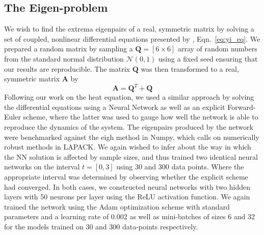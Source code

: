 \documentclass[reprint, english, nofootinbib]{revtex4-2}
\begin{document}
\subsection{The Eigen-problem}
\noindent 
We wish to find the extrema eigenpairs of a real, symmetric matrix by solving a set of coupled, nonlinear differential equations presented by \textcite{Yi_2004}, Eqn.~\ref{eq:yi_eq}. We prepared a random matrix by sampling a $\mathbf Q= [6\times 6]$ array of random numbers from the standard normal distribution $\mathcal N(0, 1)$ using a fixed seed ensuring that our results are reproducible. The matrix $\mathbf Q$ was then transformed to a real, symmetric matrix $\mathbf A$ by
\begin{equation}
    \mathbf A = \mathbf Q^T + \mathbf Q
\end{equation}
Following our work on the heat equation, we used a similar approach by solving the differential equations using a Neural Network as well as an explicit Forward-Euler scheme, where the latter was used to gauge how well the network is able to reproduce the dynamics of the system. The eigenpairs produced by the network were benchmarked against the eigh method in Numpy, which calls on numerically robust methods in LAPACK. We again wished to infer about the way in which the NN solution is affected by sample sizes, and thus trained two identical neural networks on the interval $t = [0,3]$ using 30 and 300 data points. Where the appropriate interval was determined by observing whether the explicit scheme had converged. In both cases, we constructed neural networks with two hidden layers with 50 neurons per layer using the ReLU activation function. We again trained the network using the Adam optimization scheme with standard parameters and a learning rate of 0.002 as well as mini-batches of sizes 6 and 32 for the models trained on 30 and 300 data-points respectively.
\end{document}
